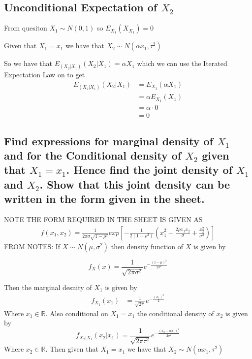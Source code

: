 \documentclass[11pt]{article}
\begin{document}
\subsection{Unconditional Expectation of $X_{2}$ }
From quesiton $X_{1} \sim N(0,1)$ so $E_{X_{1}}(X_{X_{1}})=0$

Given that $X_{1}=x_{1}$ we have that $X_{2} \sim N(\alpha x_{1}, \tau^{2})$

So we have that $E_{(X_{2}|X_{1})}(X_{2}|X_{1})= \alpha X_{1}$ which we can use the Iterated Expectation Law on to get
\begin{align*}
  E_{(X_{2}|X_{1})}(X_{2}|X_{1}) &= E_{X_{1}}(\alpha X_{1}) \\
  &= \alpha E_{X_{1}}(X_{1}) \\
  &= \alpha \cdot 0 \\
  &= 0
\end{align*}
\subsection{Find expressions for marginal density of $X_{1}$ and for the Conditional density of $X_{2}$ given that $X_{1}=x_{1}$. Hence find the joint density of $X_{1}$ and $X_{2}$. Show that this joint density can be written in the form given in the sheet.}
NOTE THE FORM REQUIRED IN THE SHEET IS GIVEN AS
\begin{align*}
  f(x_{1},x_{2}) = \frac{1}{2\pi\sigma\sqrt{1-\rho^{2}}}exp \left[ -\frac{1}{2(1-\rho^{2})}\left(x_{1}^{2} -\frac{2\rho x_{1} x_{2}}{\sigma} + \frac{x_{2}^{2}}{\sigma^{2}} \right) \right]
\end{align*}
FROM NOTES: If $X \sim N(\mu,\sigma^{2})$ then density function of $X$ is given by

\begin{equation*}
   f_{X}(x)=\frac{1}{\sqrt{2\pi\sigma^{2}}}e^{-\frac{(x-\mu)^{2}}{2\sigma^{2}}}
\end{equation*}

Then the marginal desnity of $X_{1}$ is given by
\begin{align*}
   f_{X_{1}}(x_{1})&=\frac{1}{\sqrt{2\pi}}e^{-\frac{(x_{1})^{2}}{2}}
\end{align*}
Where $x_{1} \in \mathbb{R}$. Also conditional on $X_{1}=x_{1}$ the conditional density of $x_{2}$ is given by
\begin{equation*}
   f_{X_{2}|X_{1}}(x_{2}|x_{1})=\frac{1}{\sqrt{2\pi\tau^{2}}}e^{-\frac{(x_{2}-\alpha x_{1})^{2}}{2\sigma^{2}}}
\end{equation*}
Where $x_{2} \in \mathbb{R}$. Then given that $X_{1}=x_{1}$ we have that $X_{2} \sim N(\alpha x_{1},\tau^{2})$
\end{document}
